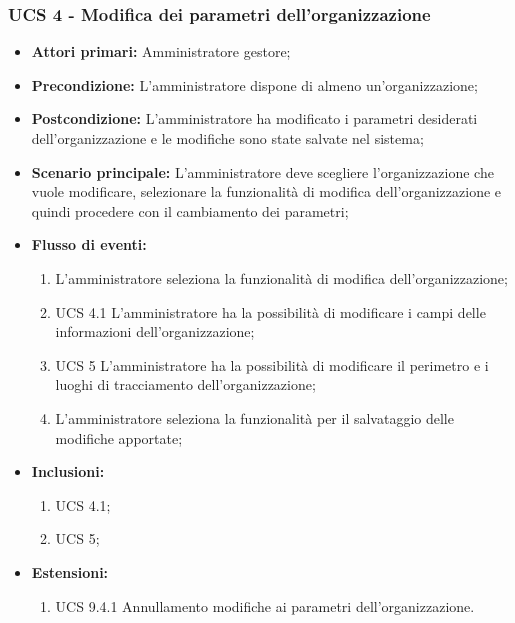 \subsubsection{UCS 4 - Modifica dei parametri dell'organizzazione}%
\begin{itemize}
    \item \textbf{Attori primari:} Amministratore gestore;
    \item \textbf{Precondizione:} L’amministratore dispone di almeno un'organizzazione;
    \item \textbf{Postcondizione:} L’amministratore ha modificato i parametri desiderati dell'organizzazione e le modifiche sono state salvate nel sistema;
    \item \textbf{Scenario principale:} L'amministratore deve scegliere l'organizzazione che vuole modificare, selezionare la funzionalità di modifica dell'organizzazione e quindi procedere con il cambiamento dei parametri;
    \item \textbf{Flusso di eventi:}
    \begin{enumerate}
        \item L'amministratore seleziona la funzionalità di modifica dell'organizzazione;
        \item UCS 4.1 L'amministratore ha la possibilità di modificare i campi delle informazioni dell’organizzazione;
        \item UCS 5 L'amministratore ha la possibilità di modificare il perimetro e i luoghi di tracciamento dell’organizzazione;
        \item L'amministratore seleziona la funzionalità per il salvataggio delle modifiche apportate;
    \end{enumerate}
    \item \textbf{Inclusioni:}
    \begin{enumerate}
        \item UCS 4.1;
        \item UCS 5;
    \end{enumerate}
    \item \textbf{Estensioni:}
    \begin{enumerate}
        \item UCS 9.4.1 Annullamento modifiche ai parametri dell'organizzazione.
    \end{enumerate}
\end{itemize}

